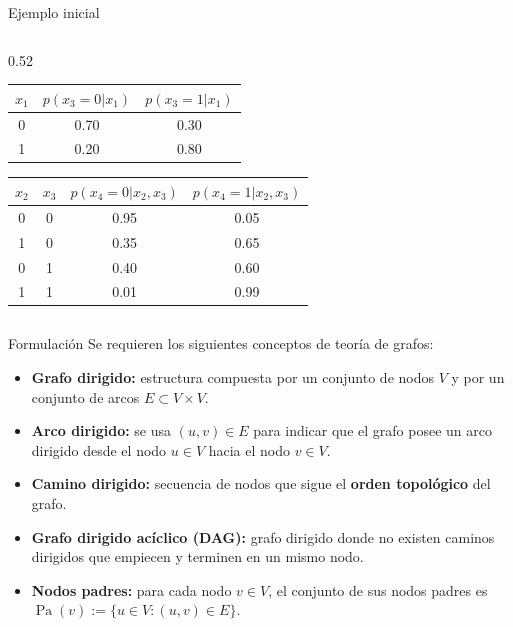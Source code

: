 \documentclass{beamer}
\begin{document}
\begin{frame}{Ejemplo inicial}
\begin{columns}[T]
\begin{column}{0.52\textwidth}
\begin{table}[h]
\begin{tabular}{|c|c|c|}
                    $x_1$ & $p(x_3 = 0|x_1)$ & $p(x_3 = 1|x_1)$ \\
                    \hline
                    0     & 0.70             & 0.30             \\
                    1     & 0.20             & 0.80             \\
                    \hline
                \end{tabular}
            \end{table}
            \begin{table}[h]
                \centering
                \begin{tabular}{|c|c|c|c|}
                    \hline
                    $x_2$ & $x_3$ & $p(x_4 = 0|x_2, x_3)$ & $p(x_4 = 1|x_2, x_3)$ \\
                    \hline
                    0     & 0     & 0.95                  & 0.05                  \\
                    1     & 0     & 0.35                  & 0.65                  \\
                    0     & 1     & 0.40                  & 0.60                  \\
                    1     & 1     & 0.01                  & 0.99                  \\
                    \hline
                \end{tabular}
            \end{table}
        \end{column}
    \end{columns}
\end{frame}

\begin{frame}{Formulación}
    Se requieren los siguientes conceptos de teoría de grafos:
    \begin{itemize}
        \item \textbf{Grafo dirigido:} estructura compuesta por un conjunto de nodos $V$ y por un conjunto de arcos $E\subset V\times V$.
        \item \textbf{Arco dirigido:} se usa $(u,v)\in E$ para indicar que el grafo posee un arco dirigido desde el nodo $u\in V$ hacia el nodo $v\in V$.
        \item \textbf{Camino dirigido:} secuencia de nodos que sigue el \textbf{orden topológico} del grafo.
        \item \textbf{Grafo dirigido acíclico (DAG):} grafo dirigido donde no existen caminos dirigidos que empiecen y terminen en un mismo nodo.
        \item \textbf{Nodos padres:} para cada nodo $v\in V$, el conjunto de sus nodos padres es $\operatorname{Pa}(v):=\{u\in V:(u,v)\in E\}$.
    \end{itemize}
\end{frame}
\end{document}
